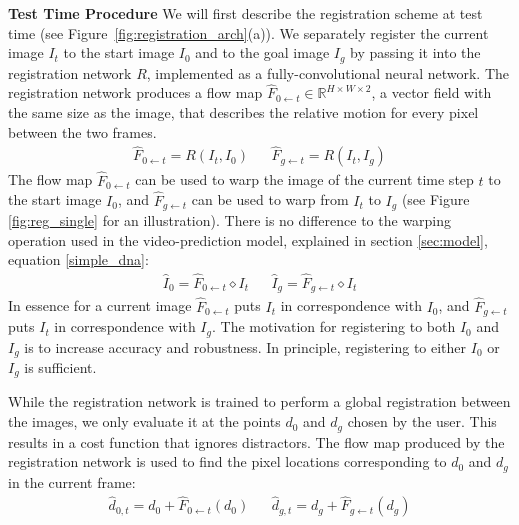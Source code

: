 \noindent \textbf{Test Time Procedure}
We will first describe the registration scheme at test time (see Figure~\ref{fig:registration_arch}(a)). We separately register the current image $I_t$ to the start image $I_0$ and to the goal image $I_g$ by passing it into the registration network $R$, implemented as a fully-convolutional neural network. The registration network produces a flow map $\hat{F}_{0 \leftarrow t} \in \mathbb{R}^{H \times W \times 2}$, a vector field with the same size as the image, that describes the relative motion for every pixel between the two frames.
\begin{align}
\hat{F}_{0 \leftarrow t} = R(I_t, I_0) &&
\hat{F}_{g \leftarrow t} = R(I_t, I_g)
\end{align}
The flow map $\hat{F}_{0 \leftarrow t}$ can be used to warp the image of the current time step $t$ to the start image $I_0$, and $\hat{F}_{g \leftarrow t}$ can be used to warp from $I_t$ to $I_g$ (see Figure \ref{fig:reg_single} for an illustration). There is no difference to the warping operation used in the video-prediction model, explained in section \ref{sec:model}, equation \ref{simple_dna}:
\begin{align}
\hat{I}_0 = \hat{F}_{0 \leftarrow t} \diamond  I_t &&
\hat{I}_g = \hat{F}_{g \leftarrow t} \diamond  I_t 
\end{align}
In essence for a current image $\hat{F}_{0 \leftarrow t}$ puts $I_t$ in correspondence with $I_0$, and $\hat{F}_{g \leftarrow t}$ puts $I_t$ in correspondence with $I_g$. The motivation for registering to both $I_0$ and $I_g$ is to increase accuracy and robustness. In principle, registering to either $I_0$ or $I_g$ is sufficient.

While the registration network is trained to perform a global registration between the images, we only evaluate it at the points $d_0$ and $d_g$ chosen by the user. This results in a cost function that ignores distractors. The flow map produced by the registration network is used to find the pixel locations corresponding to $d_0$ and $d_g$ in the current frame: 
\begin{align}
\hat{d}_{0,t} = d_0 + \hat{F}_{0 \leftarrow t}(d_0) &&
\hat{d}_{g,t} = d_g + \hat{F}_{g \leftarrow t}(d_g)
\label{eqn:warped_pos}
\end{align}


